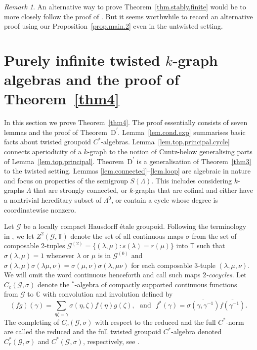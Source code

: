 \documentclass[a4paper, 12pt]{amsart}
\numberwithin{equation}{section}
\newcounter{theorem}
\theoremstyle{remark}
\newtheorem{remark}[theorem]{Remark}
\theoremstyle{definition}
\begin{document}
\begin{remark} An alternative way to prove Theorem~\ref{thm.stably.finite} would be to more closely follow the proof of \cite[Theorem~1.1]{MR3507995}. But it seems worthwhile to record an alternative proof using our Proposition~\ref{prop.main.2} even in the untwisted setting.
\end{remark}

\section{Purely infinite twisted \texorpdfstring{$k$}{k}-graph algebras  and the proof of Theorem~\ref{thm4}}

In this section we prove Theorem~\ref{thm4}. The proof essentially consists of seven
lemmas and the proof of Theorem~D\textsuperscript{$\prime$}. Lemma~\ref{lem.cond.exp} summarises
basic facts about twisted groupoid $C^*$-algebras. Lemma~\ref{lem.top.principal.cycle} connects aperiodicity
of a $k$-graph to the notion of Cuntz-below generalising parts of
Lemma~\ref{lem.top.principal}. Theorem~D\textsuperscript{$\prime$} is a generalisation of
Theorem~\ref{thm3} to the twisted setting. Lemmas \ref{lem.connected}--\ref{lem.loop} are algebraic in nature
and focus on properties of the semigroup $S(\Lambda)$. This includes considering $k$-graphs $\Lambda$ that are strongly connected, or $k$-graphs that are cofinal and either have a nontrivial hereditary subset of $\Lambda^0$, or contain a cycle whose degree is coordinatewise nonzero.

Let ${\mathcal{G}}$ be a locally compact Hausdorff \'etale groupoid. Following the terminology in
\cite{MR3519045}, we let $Z^2({\mathcal{G}},{\mathbb{T}})$ denote the set of all continuous maps $\sigma$
from the set of composable 2-tuples ${\mathcal{G}}^{(2)} = \{(\lambda,\mu) : s(\lambda) = r(\mu)\}$
into ${\mathbb{T}}$ such that $\sigma(\lambda,\mu) = 1$ whenever $\lambda$ or $\mu$ is in
${\mathcal{G}}^{(0)}$ and $\sigma(\lambda, \mu)\sigma(\lambda \mu, \nu) = \sigma(\mu,
\nu)\sigma(\lambda, \mu\nu)$ for each composable 3-tuple $(\lambda, \mu, \nu)$. We will
omit the word continuous henceforth and call such maps \emph{$2$-cocycles}. Let $C_c({\mathcal{G}},
\sigma)$ denote the $^*$-algebra of compactly supported continuous functions from ${\mathcal{G}}$
to ${\mathbb{C}}$ with convolution and involution defined by
$$(fg)(\gamma) = \sum_{\eta\zeta = \gamma}\sigma(\eta,\zeta)f(\eta)g(\zeta),  \ \ \ \text{and} \ \ \ f^*(\gamma) = \overline{\sigma(\gamma, \gamma^{-1})} \overline{f(\gamma^{-1})}.$$
The completing of $C_c({\mathcal{G}},\sigma)$ with respect to the reduced and the full $C^*$-norm are called the reduced and the full twisted groupoid $C^*$-algebra
denoted $C^*_r({\mathcal{G}},\sigma)$ and $C^*({\mathcal{G}},\sigma)$, respectively, see \cite{MR584266}.
\end{document}
